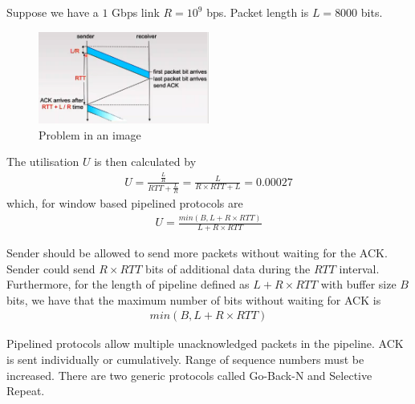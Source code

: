 \documentclass[a4paper]{article}
\theoremstyle{plain}
\theoremstyle{definition}
\newtheorem{defn}{Definition}[section]
\newtheorem{exmp}{Example}[section]
\theoremstyle{remark}
\begin{document}
\begin{tcolorbox}[colback=black!3!white,colframe=black!60!white,title=\begin{exmp}Performance of stop and wait ERQ \label{Performance of stop and wait ERQ}\end{exmp}]
        Suppose we have a $1$ Gbps link $R=10^{9}$ bps. Packet length is $L = 8000$ bits. 
	\begin{figure}[H]
		\centering
		\includegraphics[width=0.5\textwidth]{fiftysix.png}
		\caption{Problem in an image}
		\label{fig:fiftysix-png}
	\end{figure}
	The utilisation $U$ is then calculated by
	\begin{align*}
		U = \frac{\frac{L}{R}}{RTT+\frac{L}{R}}= \frac{L}{R \times RTT + L} = 0.00027
	\end{align*}
	which, for window based pipelined protocols are
	\begin{align*}
		U = \frac{min\left( B,L+R\times RTT\right) }{L+R\times RTT}
	\end{align*}
\end{tcolorbox}
\begin{tcolorbox}[colback=black!3!white,colframe=black!60!white,title=\begin{defn}Delay Bandwidth Product \label{Delay Bandwidth Product}\end{defn}]
Sender should be allowed to send more packets without waiting for the ACK. Sender could send $R \times  RTT$ bits of additional data during the $RTT$ interval. Furthermore, for the length of pipeline defined as $L+R\times RTT$ with buffer size $B$ bits, we have that the maximum number of bits without waiting for ACK is
\begin{align*}
	min(B,L+R\times RTT)
\end{align*}
\end{tcolorbox}
\begin{tcolorbox}[colback=black!3!white,colframe=black!60!white,title=\begin{defn}Pipelined protocols \label{Pipelined protocols}\end{defn}]
Pipelined protocols allow multiple unacknowledged packets in the pipeline. ACK is sent individually or cumulatively. Range of sequence numbers must be increased. There are two generic protocols called Go-Back-N and Selective Repeat. 
\end{tcolorbox}
\end{document}
